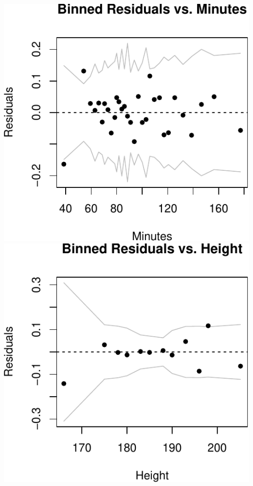 \documentclass[]{article}
\begin{document}
\includegraphics{Project_files/figure-latex/unnamed-chunk-14-1.pdf}
\includegraphics{Project_files/figure-latex/unnamed-chunk-14-2.pdf}
\end{document}

